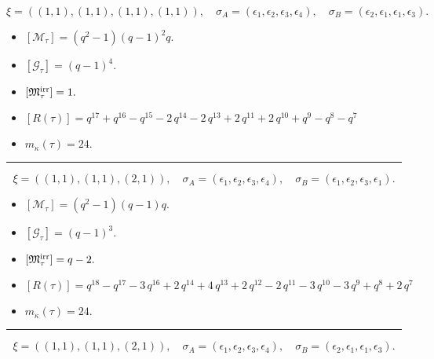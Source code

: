 \documentclass[10pt,a4paper]{amsart}
\begin{document}
$$\xi = ({(1, 1)}, {(1, 1), (1, 1)}, {(1, 1)}),\quad \sigma_A = ({{\epsilon_1}}, {{\epsilon_2}, {\epsilon_3}}, {{\epsilon_4}}),\quad \sigma_B = ({{\epsilon_2}}, {{\epsilon_1}, {\epsilon_1}}, {{\epsilon_3}}).$$

\begin{itemize}
 \item $[\mathcal{M}_{\tau}] = {\left(q^{2} - 1\right)} {\left(q - 1\right)}^{2} q .$

 \item $[\mathcal{G}_{\tau}] = {\left(q - 1\right)}^{4} .$

 \item $[{\frak M}_{\tau}^{\textrm{irr}}] = 1 .$

 \item $[R(\tau)] = q^{17} + q^{16} - q^{15} - 2 \, q^{14} - 2 \, q^{13} + 2 \, q^{11} + 2 \, q^{10} + q^{9} - q^{8} - q^{7} $

 \item $m_{\kappa}(\tau) = 24 .$

 \end{itemize}
\noindent\rule{8cm}{0.4pt}

$$\xi = ({(1, 1)}, {(1, 1)}, {(2, 1)}),\quad \sigma_A = ({{\epsilon_1}}, {{\epsilon_2}}, {{\epsilon_3, \epsilon_4}}),\quad \sigma_B = ({{\epsilon_1}}, {{\epsilon_2}}, {{\epsilon_3, \epsilon_1}}).$$

\begin{itemize}
 \item $[\mathcal{M}_{\tau}] = {\left(q^{2} - 1\right)} {\left(q - 1\right)} q .$

 \item $[\mathcal{G}_{\tau}] = {\left(q - 1\right)}^{3} .$

 \item $[{\frak M}_{\tau}^{\textrm{irr}}] = q - 2 .$

 \item $[R(\tau)] = q^{18} - q^{17} - 3 \, q^{16} + 2 \, q^{14} + 4 \, q^{13} + 2 \, q^{12} - 2 \, q^{11} - 3 \, q^{10} - 3 \, q^{9} + q^{8} + 2 \, q^{7} $

 \item $m_{\kappa}(\tau) = 24 .$

 \end{itemize}
\noindent\rule{8cm}{0.4pt}

$$\xi = ({(1, 1)}, {(1, 1)}, {(2, 1)}),\quad \sigma_A = ({{\epsilon_1}}, {{\epsilon_2}}, {{\epsilon_3, \epsilon_4}}),\quad \sigma_B = ({{\epsilon_2}}, {{\epsilon_1}}, {{\epsilon_1, \epsilon_3}}).$$
\end{document}

